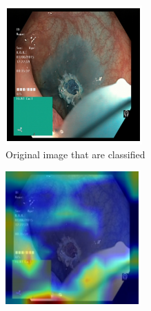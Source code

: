 \begin{figure}
     \centering
     \begin{subfigure}[b]{0.3\textwidth}
         \centering
         \includegraphics[width=\textwidth]{methodology/figures/sal1.png}
         \caption{Original image that are classified}
         \label{fig:sal1}
     \end{subfigure}
     \hfill
     \begin{subfigure}[b]{0.3\textwidth}
         \centering
         \includegraphics[width=\textwidth]{methodology/figures/sal2.png}

\end{subfigure}
\end{figure}
